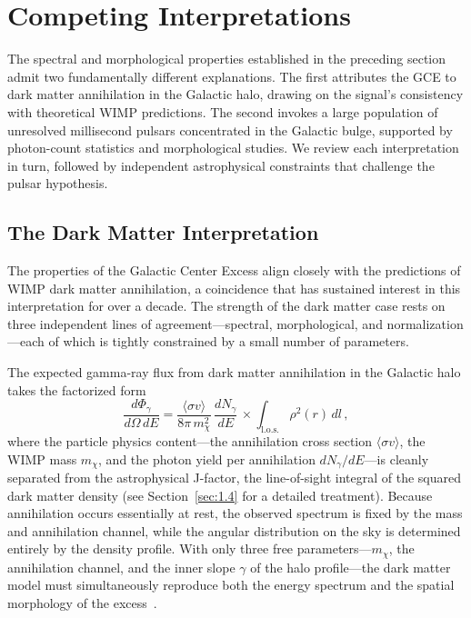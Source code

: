 
\section{Competing Interpretations}
\label{sec:4.3}

The spectral and morphological properties established in the preceding section admit two fundamentally different explanations.
The first attributes the GCE to dark matter annihilation in the Galactic halo, drawing on the signal's consistency with theoretical WIMP predictions.
The second invokes a large population of unresolved millisecond pulsars concentrated in the Galactic bulge, supported by photon-count statistics and morphological studies.
We review each interpretation in turn, followed by independent astrophysical constraints that challenge the pulsar hypothesis.

\subsection{The Dark Matter Interpretation}
\label{sec:4.3.1}

The properties of the Galactic Center Excess align closely with the predictions of WIMP dark matter annihilation, a coincidence that has sustained interest in this interpretation for over a decade.
The strength of the dark matter case rests on three independent lines of agreement---spectral, morphological, and normalization---each of which is tightly constrained by a small number of parameters.

The expected gamma-ray flux from dark matter annihilation in the Galactic halo takes the factorized form
\begin{equation}
	\frac{d\Phi_\gamma}{d\Omega\, dE} = \frac{\langle \sigma v \rangle}{8\pi\, m_\chi^2}\, \frac{dN_\gamma}{dE}\, \times \int_{\mathrm{l.o.s.}} \rho^2(r)\, dl\,,
	\label{eq:dm_flux_gce}
\end{equation}
where the particle physics content---the annihilation cross section $\langle \sigma v \rangle$, the WIMP mass $m_\chi$, and the photon yield per annihilation $dN_\gamma/dE$---is cleanly separated from the astrophysical J-factor, the line-of-sight integral of the squared dark matter density (see Section~\ref{sec:1.4} for a detailed treatment).
Because annihilation occurs essentially at rest, the observed spectrum is fixed by the mass and annihilation channel, while the angular distribution on the sky is determined entirely by the density profile.
With only three free parameters---$m_\chi$, the annihilation channel, and the inner slope $\gamma$ of the halo profile---the dark matter model must simultaneously reproduce both the energy spectrum and the spatial morphology of the excess~\cite{Daylan:2014rsa}.

